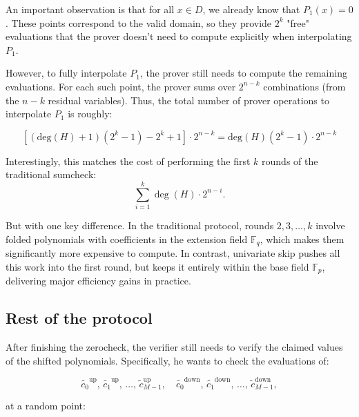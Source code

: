 \documentclass{article}
\newcommand{\Fp}{\mathbb F_p}
\newcommand{\Fq}{\mathbb F_q}
\begin{document}


An important observation is that for all $x \in D$, we already know that $P_1(x) = 0$. These points correspond to the valid domain, so they provide $2^k$ "free" evaluations that the prover doesn’t need to compute explicitly when interpolating $P_1$.

However, to fully interpolate $P_1$, the prover still needs to compute the remaining evaluations. For each such point, the prover sums over $2^{n - k}$ combinations (from the $n - k$ residual variables). Thus, the total number of prover operations to interpolate $P_1$ is roughly:

$$[(\text{deg}(H) + 1)  (2^k - 1) - 2^k + 1] \cdot 2^{n - k} = \text{deg}(H) (2^k - 1) \cdot 2^{n - k}$$



Interestingly, this matches the cost of performing the first $k$ rounds of the traditional sumcheck:
$$
\sum_{i = 1}^k \deg(H) \cdot 2^{n - i}.
$$

But with one key difference. In the traditional protocol, rounds $2, 3, \dots, k$ involve folded polynomials
with coefficients in the extension field $\Fq$, which makes them significantly more expensive to compute. In contrast, univariate skip pushes all this work into the first round, but keeps it entirely within the base field $\Fp$, delivering major efficiency gains in practice.

\subsection{Rest of the protocol}

After finishing the zerocheck, the verifier still needs to verify the claimed values of the shifted polynomials. Specifically, he wants to check the evaluations of:

$$
\widetilde{c_0}^{\text{up}}, \, \widetilde{c_1}^{\text{up}}, \, \dots, \, \widetilde{c}_{M-1}^{\text{up}}, \quad \widetilde{c_0}^{\text{down}}, \, \widetilde{c_1}^{\text{down}}, \, \dots, \, \widetilde{c}_{M-1}^{\text{down}},
$$

at a random point:
\end{document}
